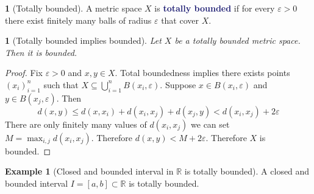 \documentclass[11pt]{article}
\numberwithin{equation}{section}
\newcommand{\navy}[1]{\textcolor{MidnightBlue}{\bf #1}}
\theoremstyle{plain}
\newtheorem{claim}{\color{ForestGreen}{\textbf{Claim}}}[section]
\theoremstyle{definition}
\newtheorem{definition}{\color{MidnightBlue}{\textbf{Definition}}}[section]
\newtheorem{example}{\color{WildStrawberry}Example}[section]
\newcommand{\1}{\mathbbm 1}
\newcommand{\e}{\varepsilon}
\newcommand{\RR}{\mathbb R}
\begin{document}
\begin{definition}[Totally bounded]
	A metric space $X$ is \navy{totally bounded} if for every $\e > 0$ there exist finitely many balls of radius $\e$ that cover $X$. 
\end{definition}

\begin{claim}[Totally bounded implies bounded]
	Let $X$ be a totally bounded metric space. Then it is bounded. 
\end{claim}
\begin{proof}
	Fix $\e > 0$ and $x,y \in X$. Total boundedness implies there exists points $(x_i)_{i=1}^n$ such that $X \subseteq \bigcup_{i=1}^n B(x_i, \e)$. Suppose $x \in B(x_i,\e)$ and $y \in B(x_j,\e)$. Then 
	\begin{equation}
	 	d(x,y) \leq d(x,x_i) + d(x_i, x_j) + d(x_j,y) < d(x_i, x_j) + 2\e
	 \end{equation} 
	 There are only finitely many values of $d(x_i, x_j)$ we can set $M = \max_{i,j} d(x_i, x_j)$. Therefore $d(x,y) < M + 2\e$. Therefore $X$ is bounded. 
\end{proof}


\begin{example}[Closed and bounded interval in $\RR$ is totally bounded]
	A closed and bounded interval $I = [a,b] \subset \RR$ is totally bounded. 
\end{example}
\end{document}
